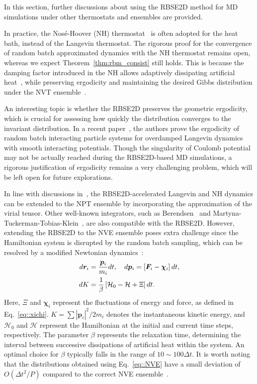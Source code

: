 In this section, further discussions about using the RBSE2D method for MD simulations under other thermostats and ensembles are provided.

In practice, the Nos{\'e}-Hoover (NH) thermostat~\cite{hoover1985canonical} is often adopted for the heat bath, instead of the Langevin thermostat. 
The rigorous proof for the convergence of random batch approximated dynamics with the NH thermostat remains open, whereas we expect Theorem~\ref{thm:rbm_consist} still holds. 
This is because the damping factor introduced in the NH allows adaptively dissipating artificial heat~\cite{jones2011adaptive}, while preserving ergodicity and maintaining the desired Gibbs distribution under the NVT ensemble~\cite{herzog2018exponential}.

An interesting topic is whether the RBSE2D preserves the geometric ergodicity, which is crucial for assessing how quickly the distribution converges to the invariant distribution. 
In a recent paper~\cite{jin2023ergodicity}, the authors prove the ergodicity of random batch interacting particle systems for overdamped Langevin dynamics with smooth interacting potentials. 
Though the singularity of Coulomb potential may not be actually reached during the RBSE2D-based MD simulations, a rigorous justification of ergodicity remains a very challenging problem, which will be left open for future explorations.

In line with discussions in~\cite{liang2022random}, the RBSE2D-accelerated Langevin and NH dynamics can be extended to the NPT ensemble by incorporating the approximation of the virial tensor. Other well-known integrators, such as Berendsen~\cite{berendsen1984molecular} and Martyna-Tuckerman-Tobias-Klein~\cite{martyna1996explicit}, are also compatible with the RBSE2D. However, extending the RBSE2D to the NVE ensemble poses extra challenge since the Hamiltonian system is disrupted by the random batch sampling, which can be resolved by a modified Newtonian dynamics~\cite{liang2024JCP}:
\begin{equation}\label{eq::NVE}
	\begin{split}
		d\boldsymbol{r}_i&=\frac{\boldsymbol{p}_i}{m_i}dt,\quad d \bm{p}_i=\left[\boldsymbol{F}_i-\bm{\chi}_i\right]dt,\\
		dK&=\frac{1}{\beta}\left[\mathcal H_0-\mathcal H+\Xi\right] dt.
	\end{split}
\end{equation}
Here, $\Xi$ and $\bm{\chi}_i$ represent the fluctuations of energy and force, as defined in Eq.~\eqref{eq::xichi}. $K=\sum |\bm{p}_i|^2/2m_i$ denotes the instantaneous kinetic energy, and $\mathcal H_0$ and $\mathcal H$ represent the Hamiltonian at the initial and current time steps, respectively. The parameter $\beta$ represents the relaxation time, determining the interval between successive dissipations of artificial heat within the system. An optimal choice for $\beta$ typically falls in the range of $10\sim 100\Delta t$. It is worth noting that the distributions obtained using Eq.~\eqref{eq::NVE} have a small deviation of $O(\Delta t^2/P)$ compared to the correct NVE ensemble~\cite{liang2024JCP}.

